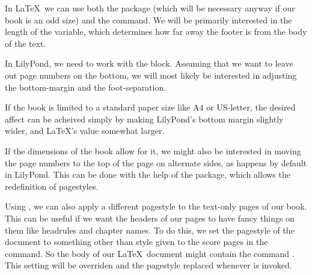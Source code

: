 \documentclass[../../LilyPond-Tutorials]{subfiles}
\begin{document}
In \LaTeX\ we can use both the  package (which will be necessary anyway if our book is an odd size) and the  command. 
We will be primarily interested in the length of the  variable, which determines how far away the footer is from the body of the text.

In LilyPond, we need to work with the  block. 
Assuming that we want to leave out page numbers on the bottom, we will most likely be interested in adjusting the  bottom-margin and the foot-separation.

If the book is limited to a standard paper size like A4 or US-letter, the desired affect can be acheived simply by making LilyPond's bottom margin slightly wider, and \LaTeX's  value somewhat larger.

If the dimensions of the book allow for it, we might also be interested in moving the page numbers to the top of the page on alternate sides, as happens by default in LilyPond. 
This can be done with the help of the  package, which allows the redefinition of pagestyles. 

Using , we can also apply a different pagestyle to the text-only pages of our book. 
This can be useful if we want the headers of our pages to have fancy things on them like headrules and chapter names. 
To do this, we set the pagestyle of the document to something other than style given to the score pages in the   command. 
So the body of our \LaTeX\ document might contain the command . 
This setting will be overriden and the pagestyle replaced whenever  is invoked.

\bigskip
{}
\end{document}
